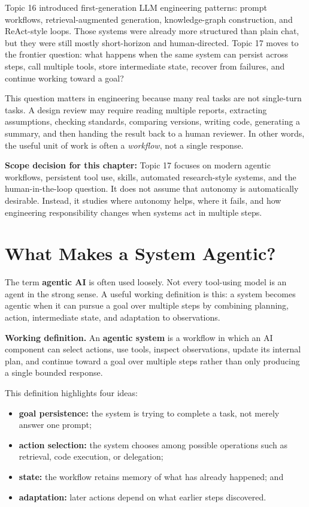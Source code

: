 \documentclass[12pt]{article}
\begin{document}
Topic 16 introduced first-generation LLM engineering patterns: prompt workflows, retrieval-augmented generation, knowledge-graph construction, and ReAct-style loops. Those systems were already more structured than plain chat, but they were still mostly short-horizon and human-directed. Topic 17 moves to the frontier question: what happens when the same system can persist across steps, call multiple tools, store intermediate state, recover from failures, and continue working toward a goal?

This question matters in engineering because many real tasks are not single-turn tasks. A design review may require reading multiple reports, extracting assumptions, checking standards, comparing versions, writing code, generating a summary, and then handing the result back to a human reviewer. In other words, the useful unit of work is often a \emph{workflow}, not a single response.

\begin{alert-box}
\textbf{Scope decision for this chapter:} Topic 17 focuses on modern agentic workflows, persistent tool use, skills, automated research-style systems, and the human-in-the-loop question. It does not assume that autonomy is automatically desirable. Instead, it studies where autonomy helps, where it fails, and how engineering responsibility changes when systems act in multiple steps.
\end{alert-box}

\section{What Makes a System Agentic?}

The term \textbf{agentic AI} is often used loosely. Not every tool-using model is an agent in the strong sense. A useful working definition is this: a system becomes agentic when it can pursue a goal over multiple steps by combining planning, action, intermediate state, and adaptation to observations.

\begin{def-box}
\textbf{Working definition.} An \textbf{agentic system} is a workflow in which an AI component can select actions, use tools, inspect observations, update its internal plan, and continue toward a goal over multiple steps rather than only producing a single bounded response.
\end{def-box}

This definition highlights four ideas:
\begin{itemize}
    \item \textbf{goal persistence:} the system is trying to complete a task, not merely answer one prompt;
    \item \textbf{action selection:} the system chooses among possible operations such as retrieval, code execution, or delegation;
    \item \textbf{state:} the workflow retains memory of what has already happened; and
    \item \textbf{adaptation:} later actions depend on what earlier steps discovered.
\end{itemize}
\end{document}
